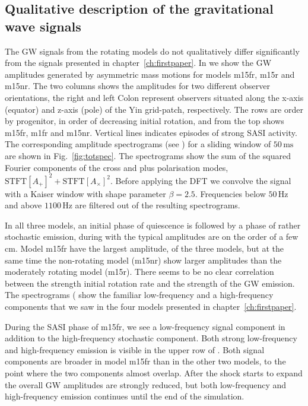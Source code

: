 \subsection{Qualitative description of the gravitational wave signals}
The GW signals from the rotating models do not qualitatively differ significantly from
the signals presented in chapter~\ref{ch:firstpaper}. In  we show the
GW amplitudes generated by asymmetric mass motions for models m15fr, m15r and m15nr.
The two columns shows the amplitudes for two different observer orientations,
the right and left Colon represent observers situated along the x-axis (equator) and z-axis (pole) of the Yin grid-patch,
respectively. The rows are order by progenitor, in order of decreasing initial rotation, and from the top
shows m15fr, m1fr and m15nr. Vertical lines indicates episodes of strong SASI activity.
The corresponding amplitude spectrograms (see ) for a sliding window of $50 \, \mathrm{ms}$ are shown 
in Fig.~\ref{fig:totspec}. The spectrograms show the sum of the squared Fourier
components of the cross and plus polarisation modes,
$\text{STFT}[{A_+}]^2 + \text{STFT}[{A_{\times}}]^2$. Before applying the
DFT we convolve the signal with a Kaiser window with shape parameter $\beta = 2.5$. Frequencies
below $50 \, \mathrm{Hz}$ and above $1100  \, \mathrm{Hz}$ are filtered out of the resulting spectrograms. 

In all three models, an initial phase of quiescence is followed by a phase of rather stochastic emission, 
during with the typical amplitudes are on the order of a few cm. Model m15fr have the largest amplitude, of the three
models, but at the same time the non-rotating model (m15nr) show larger amplitudes than the moderately rotating model (m15r).
There seems to be no clear correlation between the strength initial rotation rate and the strength of the GW emission. 
The spectrograms ( show the familiar low-frequency and a high-frequency components that we saw in the
four models presented in chapter~\ref{ch:firstpaper}.

During the SASI phase of m15fr, we see a low-frequency signal component in addition 
to the high-frequency stochastic component. Both strong low-frequency and high-frequency
emission is visible in the upper row of . Both signal components
are broader in model m15fr than in the other two models, to the point where the two components almost
overlap. After the shock starts to expand the overall GW amplitudes are strongly reduced, but
both low-frequency and high-frequency emission continues until the end of the simulation.

